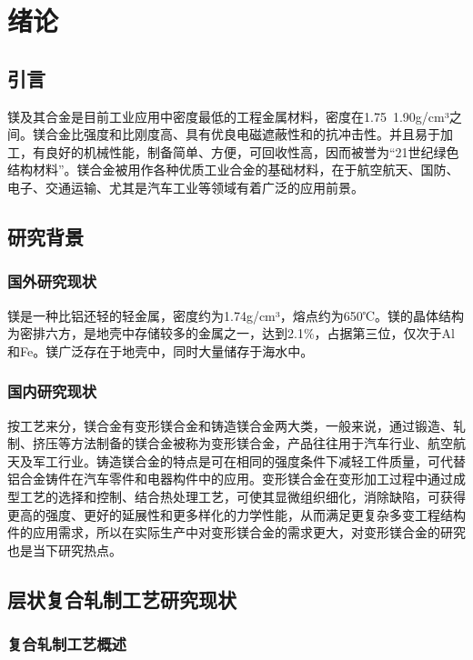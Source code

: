 \section{绪论}
\subsection{引言}

镁及其合金是目前工业应用中密度最低的工程金属材料，密度在1.75~1.90g/cm³之间。镁合金比强度和比刚度高、具有优良电磁遮蔽性和的抗冲击性。并且易于加工，有良好的机械性能，制备简单、方便，可回收性高，因而被誉为“21世纪绿色结构材料”\cite{a1,i2}。镁合金被用作各种优质工业合金的基础材料，在于航空航天、国防、电子、交通运输、尤其是汽车工业等领域有着广泛的应用前景\cite{a1,a3,i4}。\par

\subsection{研究背景}
\subsubsection{国外研究现状}

镁是一种比铝还轻的轻金属，密度约为1.74g/cm³，熔点约为650℃。镁的晶体结构为密排六方，是地壳中存储较多的金属之一，达到2.1$\%$，占据第三位，仅次于Al和Fe。镁广泛存在于地壳中，同时大量储存于海水中。\par

\subsubsection{国内研究现状}

按工艺来分，镁合金有变形镁合金和铸造镁合金两大类，一般来说，通过锻造、轧制、挤压等方法制备的镁合金被称为变形镁合金，产品往往用于汽车行业、航空航天及军工行业。铸造镁合金的特点是可在相同的强度条件下减轻工件质量，可代替铝合金铸件在汽车零件和电器构件中的应用。变形镁合金在变形加工过程中通过成型工艺的选择和控制、结合热处理工艺，可使其显微组织细化，消除缺陷，可获得更高的强度、更好的延展性和更多样化的力学性能，从而满足更复杂多变工程结构件的应用需求，所以在实际生产中对变形镁合金的需求更大，对变形镁合金的研究也是当下研究热点。\par

\subsection{层状复合轧制工艺研究现状}
\subsubsection{复合轧制工艺概述}

